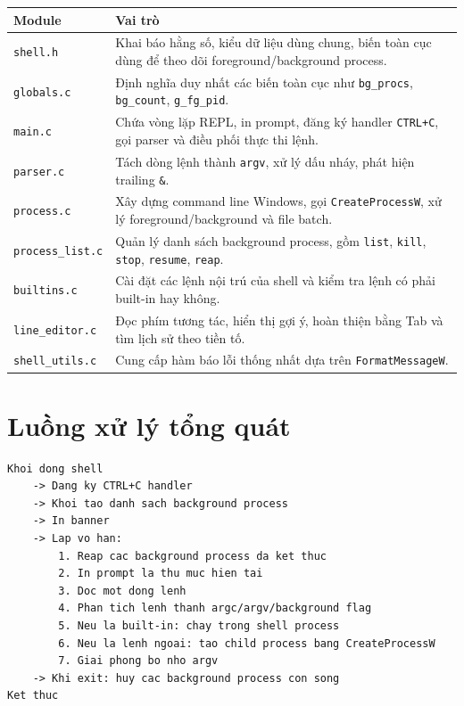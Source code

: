\documentclass[13pt,a4paper,oneside]{extreport}
\begin{document}
\begin{longtable}{|p{4cm}|p{10.5cm}|}
	\hline
	\textbf{Module}          & \textbf{Vai trò}                                                                                                       \\
	\hline
	\texttt{shell.h}         & Khai báo hằng số, kiểu dữ liệu dùng chung, biến toàn cục dùng để theo dõi foreground/background process.               \\
	\hline
	\texttt{globals.c}       & Định nghĩa duy nhất các biến toàn cục như \texttt{bg\_procs}, \texttt{bg\_count}, \texttt{g\_fg\_pid}.                 \\
	\hline
	\texttt{main.c}          & Chứa vòng lặp REPL, in prompt, đăng ký handler \texttt{CTRL+C}, gọi parser và điều phối thực thi lệnh.                 \\
	\hline
	\texttt{parser.c}        & Tách dòng lệnh thành \texttt{argv}, xử lý dấu nháy, phát hiện trailing \texttt{\&}.                                    \\
	\hline
	\texttt{process.c}       & Xây dựng command line Windows, gọi \texttt{CreateProcessW}, xử lý foreground/background và file batch.                 \\
	\hline
	\texttt{process\_list.c} & Quản lý danh sách background process, gồm \texttt{list}, \texttt{kill}, \texttt{stop}, \texttt{resume}, \texttt{reap}. \\
	\hline
	\texttt{builtins.c}      & Cài đặt các lệnh nội trú của shell và kiểm tra lệnh có phải built-in hay không.                                        \\
	\hline
	\texttt{line\_editor.c}  & Đọc phím tương tác, hiển thị gợi ý, hoàn thiện bằng Tab và tìm lịch sử theo tiền tố.                                   \\
	\hline
	\texttt{shell\_utils.c}  & Cung cấp hàm báo lỗi thống nhất dựa trên \texttt{FormatMessageW}.                                                      \\
	\hline
\end{longtable}

\section{Luồng xử lý tổng quát}

\begin{lstlisting}[language={},caption={Luồng xử lý chính của myShell}]
Khoi dong shell
    -> Dang ky CTRL+C handler
    -> Khoi tao danh sach background process
    -> In banner
    -> Lap vo han:
        1. Reap cac background process da ket thuc
        2. In prompt la thu muc hien tai
        3. Doc mot dong lenh
        4. Phan tich lenh thanh argc/argv/background flag
        5. Neu la built-in: chay trong shell process
        6. Neu la lenh ngoai: tao child process bang CreateProcessW
        7. Giai phong bo nho argv
    -> Khi exit: huy cac background process con song
Ket thuc
\end{lstlisting}
\end{document}
